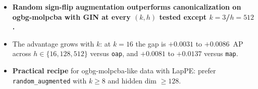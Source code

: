 \documentclass[11pt]{article}
\begin{document}
\begin{itemize}\itemsep2pt
\item \textbf{Random sign-flip augmentation outperforms canonicalization
      on ogbg-molpcba with GIN at every $(k, h)$ tested except
      $k\!=\!3$/$h\!=\!512$.}
\item The advantage grows with $k$: at $k\!=\!16$ the gap is
      $+0.0031$ to $+0.0086$~AP across $h\!\in\!\{16,128,512\}$ versus
      \texttt{oap}, and $+0.0081$ to $+0.0137$ versus \texttt{map}.
\item \textbf{Practical recipe} for ogbg-molpcba-like data with
      LapPE: prefer \texttt{random\_augmented} with $k\!\geq\!8$ and
      hidden dim $\geq\!128$.
\end{itemize}
\end{document}
